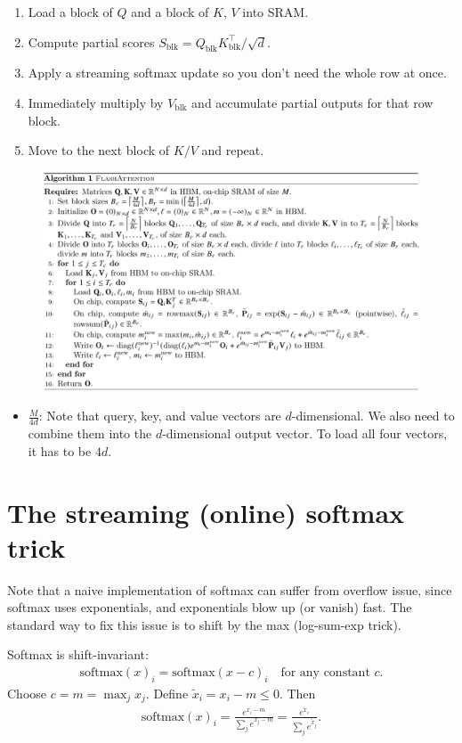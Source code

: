 \begin{enumerate}
	\item Load a block of $Q$ and a block of $K$, $V$ into SRAM.
	\item Compute partial scores $S_{\text{blk}} = Q_{\text{blk}}K_{\text{blk}}^\top/\sqrt{d}$.
	\item Apply a streaming softmax update so you don't need the whole row at once.
	\item Immediately multiply by $V_{\text{blk}}$ and accumulate partial
		outputs for that row block.
	\item Move to the next block of $K/V$ and repeat.
\end{enumerate}

\begin{figure}[t]
	\centering
	\includegraphics[scale=0.45]{./images/flash_attn.png}
\end{figure}
\begin{itemize}
	\item $\frac{M}{4d}$: Note that query, key, and value vectors are $d$-dimensional. We also need to combine them into the $d$-dimensional output vector. To load all four vectors, it has to be $4d$.
\end{itemize}


\section{The streaming (online) softmax trick}

Note that a naive implementation of softmax can suffer from overflow issue, since softmax uses exponentials, and exponentials blow up (or vanish) fast. The standard way to fix this issue is to shift by the max (\ie log-sum-exp trick).

Softmax is shift-invariant:
\begin{align*}
	\mathrm{softmax}(x)_i = \mathrm{softmax}(x - c)_i \quad \text{for any constant } c.
\end{align*}
Choose $c = m = \max_j x_j$. Define $\tilde{x}_i = x_i - m \le 0$. Then
\begin{align*}
	\mathrm{softmax}(x)_i
	= \frac{e^{x_i - m}}{\sum_j e^{x_j - m}}
	= \frac{e^{\tilde{x}_i}}{\sum_j e^{\tilde{x}_j}}.
\end{align*}

